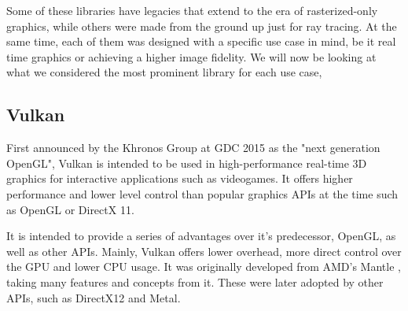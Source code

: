 Some of these libraries have legacies that extend to the era of rasterized-only graphics, while others were made from the ground up just for ray tracing. At the same time, each of them was designed with a specific use case in mind, be it real time graphics or achieving a higher image fidelity. We will now be looking at what we considered the most prominent library for each use case,

\subsection{Vulkan}
First announced by the Khronos Group at GDC 2015 as the "next generation OpenGL", Vulkan is intended to be used in high-performance real-time 3D graphics for interactive applications such as videogames. It offers higher performance and lower level control than popular graphics APIs at the time such as OpenGL or DirectX 11.

It is intended to provide a series of advantages over it's predecessor, OpenGL, as well as other APIs. Mainly, Vulkan offers lower overhead, more direct control over the GPU and lower CPU usage. It was originally developed from AMD's Mantle \cite{Mantle}, taking many features and concepts from it. These were later adopted by other APIs, such as DirectX12 and Metal.

